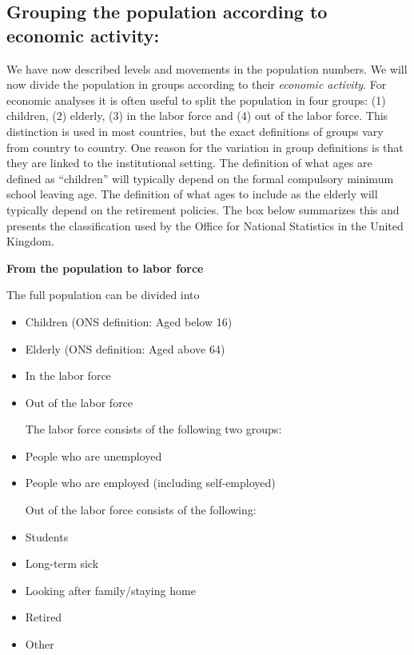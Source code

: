 \documentclass[]{book}
\newenvironment{myblock}%
{%
 \begin{tcolorbox}%
}%
{\end{tcolorbox}}%
\begin{document}
\hypertarget{grouping-the-population-according-to-economic-activity}{%
\subsection{Grouping the population according to economic activity:}\label{grouping-the-population-according-to-economic-activity}}

We have now described levels and movements in the population numbers. We will now divide the population in groups according to their \emph{economic activity}. For economic analyses it is often useful to split the population in four groups: (1) children, (2) elderly, (3) in the labor force and (4) out of the labor force. This distinction is used in most countries, but the exact definitions of groups vary from country to country. One reason for the variation in group definitions is that they are linked to the institutional setting. The definition of what ages are defined as ``children'' will typically depend on the formal compulsory minimum school leaving age. The definition of what ages to include as the elderly will typically depend on the retirement policies. The box below summarizes this and presents the classification used by the Office for National Statistics in the United Kingdom.

\begin{myblock}
\textbf{From the population to labor force}

The full population can be divided into

\begin{itemize}
\item
  Children (ONS definition: Aged below 16)
\item
  Elderly (ONS definition: Aged above 64)
\item
  In the labor force
\item
  Out of the labor force

  The labor force consists of the following two groups:
\item
  People who are unemployed
\item
  People who are employed (including self-employed)

  Out of the labor force consists of the following:
\item
  Students
\item
  Long-term sick
\item
  Looking after family/staying home
\item
  Retired
\item
  Other
\end{itemize}
\end{myblock}
\end{document}
